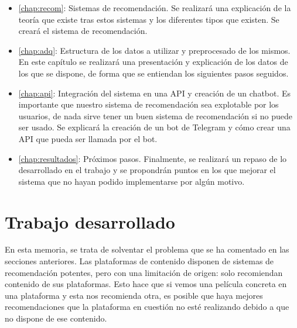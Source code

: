 \begin{itemize}
    \item \autoref{chap:recom}: Sistemas de recomendación. Se realizará una explicación de la teoría que existe tras estos sistemas y los diferentes tipos que existen. Se creará el sistema de recomendación.
    \item \autoref{chap:adq}: Estructura de los datos a utilizar y preprocesado de los mismos. En este capítulo se realizará una presentación y explicación de los datos de los que se dispone, de forma que se entiendan los siguientes pasos seguidos.
    
    \item \autoref{chap:api}: Integración del sistema en una API y creación de un chatbot. Es importante que nuestro sistema de recomendación sea explotable por los usuarios, de nada sirve tener un buen sistema de recomendación si no puede ser usado. Se explicará la creación de un bot de Telegram y cómo crear una API que pueda ser llamada por el bot.
    \item \autoref{chap:resultados}: Próximos pasos. Finalmente, se realizará un repaso de lo desarrollado en el trabajo y se propondrán puntos en los que mejorar el sistema que no hayan podido implementarse por algún motivo.
\end{itemize}

\section{Trabajo desarrollado}\label{sec:trabajodesarrollado}

En esta memoria, se trata de solventar el problema que se ha comentado en las secciones anteriores. Las plataformas de contenido disponen de sistemas de recomendación potentes, pero con una limitación de origen: solo recomiendan contenido de sus plataformas. Esto hace que si vemos una película concreta en una plataforma y esta nos recomienda otra, es posible que haya mejores recomendaciones que la plataforma en cuestión no esté realizando debido a que no dispone de ese contenido.\\ 

